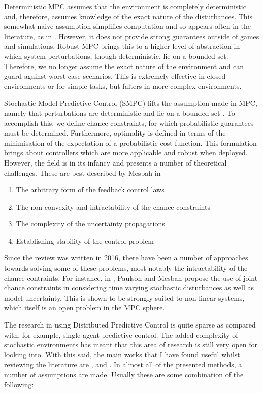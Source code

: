 \documentclass[preprint,11pt]{report}
\begin{document}
Deterministic MPC assumes that the environment is completely deterministic and, therefore, assumes
knowledge of the exact nature of the disturbances. This somewhat naive assumption simplifies
computation and so appears often in the literature, as in \cite{Rosolia2018}. However, it does not
provide strong guarantees outside of games and simulations. Robust MPC brings this to a higher level
of abstraction in which system perturbations, though deterministic, lie on a bounded set. Therefore,
we no longer assume the exact nature of the environment and can guard against worst case scenarios.
This is extremely effective in closed environments or for simple tasks, but falters in more complex
environments.

Stochastic Model Predictive Control (SMPC) lifts the assumption made in MPC, namely that
perturbations are deterministic and lie on a bounded set \cite{Mesbah2016}. To accomplish this, we
define chance constraints, for which probabilistic guarantees must be determined. Furthermore,
optimality is defined in terms of the minimisation of the expectation of a probabilistic
cost function. This formulation brings about controllers which are more applicable and robust when
deployed. However, the field is in its infancy and presents a number of theoretical challenges.
These are best described by Mesbah in \cite{Mesbah2016}

\begin{enumerate}
	\item The arbitrary form of the feedback control laws
	\item The non-convexity and intractability of the chance constraints
	\item The complexity of the uncertainty propagations
	\item Establishing stability of the control problem
\end{enumerate}

Since the review \cite{Mesbah2016} was written in 2016, there have been a number of approaches
towards solving some of these problems, most notably the intractability of the chance contraints.
For instance, in  \cite{Paulson2019}, Paulson and Mesbah propose the use of joint chance constraints
in considering time varying stochastic disturbances as well as model uncertainty. This is shown to
be strongly suited to non-linear systems, which itself is an open problem in the MPC sphere.

The research in using Distributed Predictive Control is quite sparse as compared with, for example,
single agent predictive control. The added complexity of stochastic environments has meant that this
area of research is still very open for looking into. With this said, the main works that I have
found useful whilst reviewing the literature are \cite{Conte2014}, \cite{Christofides2013} and 
\cite{Giulioni2015}. In almost all of the presented methods, a number of assumptions are made.
Usually these are some combination of the following:
\end{document}
